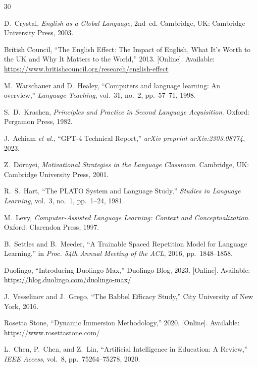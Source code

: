 \documentclass[conference]{IEEEtran}
\begin{document}
\begin{thebibliography}{30}

D.~Crystal, \textit{English as a Global Language}, 2nd~ed. Cambridge, UK: Cambridge University Press, 2003.

British Council, ``The English Effect: The Impact of English, What It's Worth to the UK and Why It Matters to the World,'' 2013. [Online]. Available: \url{https://www.britishcouncil.org/research/english-effect}

M.~Warschauer and D.~Healey, ``Computers and language learning: An overview,'' \textit{Language Teaching}, vol.~31, no.~2, pp.~57--71, 1998.

S.~D.~Krashen, \textit{Principles and Practice in Second Language Acquisition}. Oxford: Pergamon Press, 1982.

J.~Achiam \textit{et al.}, ``GPT-4 Technical Report,'' \textit{arXiv preprint arXiv:2303.08774}, 2023.

Z.~D{\"o}rnyei, \textit{Motivational Strategies in the Language Classroom}. Cambridge, UK: Cambridge University Press, 2001.

R.~S.~Hart, ``The PLATO System and Language Study,'' \textit{Studies in Language Learning}, vol.~3, no.~1, pp.~1--24, 1981.

M.~Levy, \textit{Computer-Assisted Language Learning: Context and Conceptualization}. Oxford: Clarendon Press, 1997.

B.~Settles and B.~Meeder, ``A Trainable Spaced Repetition Model for Language Learning,'' in \textit{Proc. 54th Annual Meeting of the ACL}, 2016, pp.~1848--1858.

Duolingo, ``Introducing Duolingo Max,'' Duolingo Blog, 2023. [Online]. Available: \url{https://blog.duolingo.com/duolingo-max/}

J.~Vesselinov and J.~Grego, ``The Babbel Efficacy Study,'' City University of New York, 2016.

Rosetta Stone, ``Dynamic Immersion Methodology,'' 2020. [Online]. Available: \url{https://www.rosettastone.com/}

L.~Chen, P.~Chen, and Z.~Lin, ``Artificial Intelligence in Education: A Review,'' \textit{IEEE Access}, vol.~8, pp.~75264--75278, 2020.


\end{thebibliography}
\end{document}
